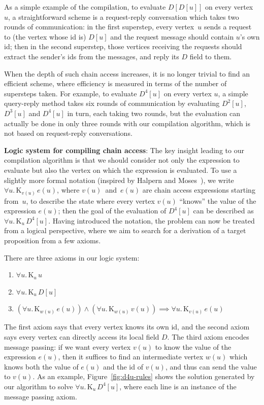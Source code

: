 \documentclass{sokendai_thesis} %
\newcommand{\knows}[2]{\mathrm K_{#1}\,{#2}}
\begin{document}
As a simple example of the compilation, to evaluate $D[D[u]]$ on every vertex~$u$, a straightforward scheme is a request-reply conversation which takes two rounds of communication:
in the first superstep, every vertex~$u$ sends a request to (the vertex whose id is) $D[u]$ and the request message should contain $u$'s own id;
then in the second superstep, those vertices receiving the requests should extract the sender's ids from the messages, and reply its $D$ field to them.

When the depth of such chain access increases, it is no longer trivial to find an efficient scheme, where efficiency is measured in terms of the number of supersteps taken.
For example, to evaluate $D^4[u]$ on every vertex $u$, a simple query-reply method takes six rounds of communication by evaluating $D^2[u]$, $D^3[u]$ and $D^4[u]$ in turn, each taking two rounds, but the evaluation can actually be done in only three rounds with our compilation algorithm, which is not based on request-reply conversations.

\textbf{Logic system for compiling chain access}:
The key insight leading to our compilation algorithm is that we should consider not only the expression to evaluate but also the vertex on which the expression is evaluated.
To use a slightly more formal notation (inspired by Halpern and Moses~\cite{Halpern-common-knowledge}), we write $\forall u.\,\knows{v(u)}{e(u)}$, where $v(u)$~and~$e(u)$ are chain access expressions starting from~$u$, to describe the state where every vertex $v(u)$ ``knows'' the value of the expression $e(u)$; then the goal of the evaluation of $D^4[u]$ can be described as $\forall u.\,\knows{u}{D^4[u]}$.
Having introduced the notation, the problem can now be treated from a logical perspective, where we aim to search for a derivation of a target proposition from a few axioms.

There are three axioms in our logic system:
\begin{enumerate}\setlength\itemsep{0em}
\item $\forall u.\,\knows{u}{u}$
\item $\forall u.\,\knows{u}{\mathit{D}[u]}$
\item $(\forall u.\,\knows{w(u)}{e(u)}) \wedge (\forall u.\,\knows{w(u)}{v(u)}) \implies \forall u.\,\knows{v(u)}{e(u)}$
\end{enumerate}
The first axiom says that every vertex knows its own id, and the second axiom says every vertex can directly access its local field $D$.
The third axiom encodes message passing: if we want every vertex $v(u)$ to know the value of the expression $e(u)$, then it suffices to find an intermediate vertex $w(u)$ which knows both the value of $e(u)$ and the id of $v(u)$, and thus can send the value to $v(u)$.
As an example, Figure~\ref{fig:d4u-rules} shows the solution generated by our algorithm to solve $\forall u.\,\knows{u}{D^4[u]}$, where each line is an instance of the message passing axiom.
\end{document}
